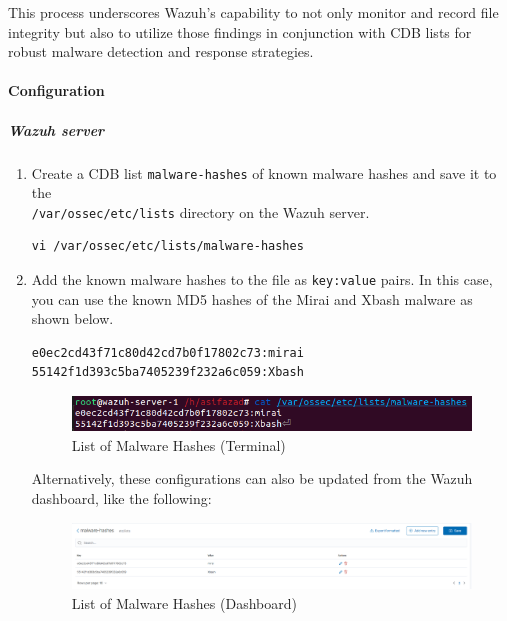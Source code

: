 This process underscores Wazuh's capability to not only monitor and record file integrity but also to utilize those findings in conjunction with CDB lists for robust malware detection and response strategies.

\paragraph{Configuration}
\subparagraph{Wazuh server}
\begin{enumerate}
    \item Create a CDB list \texttt{malware-hashes} of known malware hashes and save it to the\\ \texttt{/var/ossec/etc/lists} directory on the Wazuh server.
    \begin{verbatim}
vi /var/ossec/etc/lists/malware-hashes
    \end{verbatim}
    \item Add the known malware hashes to the file as \texttt{key:value} pairs. In this case, you can use the known MD5 hashes of the Mirai and Xbash malware as shown below.
    \begin{verbatim}
e0ec2cd43f71c80d42cd7b0f17802c73:mirai
55142f1d393c5ba7405239f232a6c059:Xbash
    \end{verbatim}
    \begin{figure}[H]
        \centering
        \includegraphics[width=\textwidth]{images/malware-detection/cdb/1.png}
        \caption{List of Malware Hashes (Terminal)}
        \label{fig:malware-hash-1}
    \end{figure}
    Alternatively, these configurations can also be updated from the Wazuh dashboard, like the following:
    \begin{figure}[H]
        \centering
        \includegraphics[width=\textwidth]{images/malware-detection/cdb/2.png}
        \caption{List of Malware Hashes (Dashboard)}
        \label{fig:malware-hash}
    \end{figure}
    

\end{enumerate}
